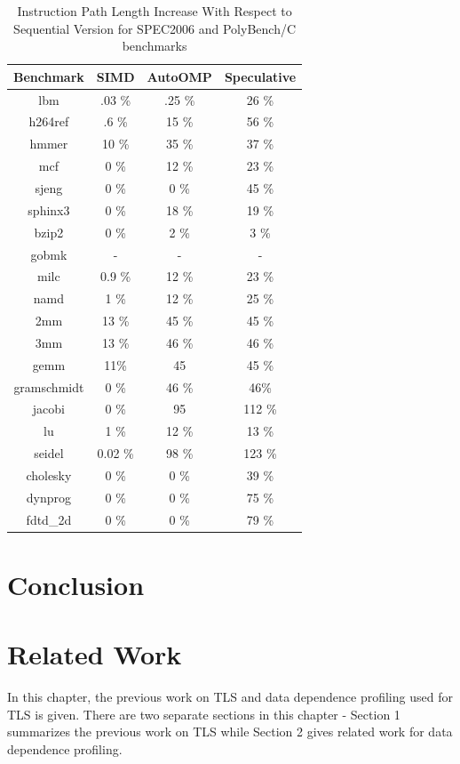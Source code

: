 \documentclass[10pt]{report}          %
\begin{document}
\begin{table}
\centering
\caption{Instruction Path Length Increase With Respect to Sequential Version for SPEC2006 and PolyBench/C benchmarks}
\begin{tabular}{|c||c|c|c|} \hline
Benchmark & SIMD & AutoOMP & Speculative\\ \hline 
lbm & .03 \% & .25 \% & 26 \%\\ \hline
h264ref & .6 \% & 15 \% & 56 \% \\ \hline
hmmer  & 10 \% & 35 \% & 37 \%  \\ \hline
mcf  & 0 \% & 12 \% & 23 \% \\ \hline
sjeng  & 0 \% & 0 \% & 45 \%  \\ \hline
sphinx3  & 0 \% & 18 \% & 19 \%  \\ \hline
bzip2 & 0 \% & 2 \% & 3 \%  \\ \hline
gobmk  & - & - & -  \\ \hline
milc  & 0.9 \% & 12 \% & 23 \%  \\ \hline
namd & 1 \% & 12 \% & 25 \%  \\ \hline
2mm	& 13 \% & 45 \% & 45 \% \\ \hline
3mm	 & 13 \% & 46 \% & 46 \% \\ \hline
gemm	  & 11\% & 45 & 45 \% \\ \hline
gramschmidt	 & 0 \% & 46 \% & 46\% \\ \hline
jacobi & 0 \% & 95 & 112 \%  \\ \hline
lu	 & 1 \% & 12 \% & 13 \% \\ \hline
seidel&	 0.02 \% & 98 \% & 123 \% \\ \hline
cholesky  & 0 \% & 0 \% & 39 \%\\ \hline
dynprog& 0 \% & 0 \% & 75 \%\\ \hline
fdtd\_2d  & 0 \% & 0 \% & 79 \% \\ \hline
\hline\end{tabular}
\label{table:instruction_path}
\end{table}


\chapter{Conclusion}
\chapter{Related Work}

In this chapter, the previous work on TLS and data dependence profiling used for TLS is given.  There are two separate sections in this chapter - Section 1 summarizes the previous work on TLS while Section 2 gives related work for data dependence profiling.
\end{document}

